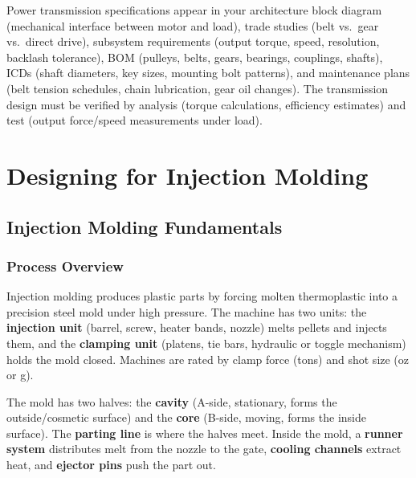 \documentclass[11pt,letterpaper,twoside,openany]{book}
\begin{document}
\begin{tipbox}
Power transmission specifications appear in your architecture block diagram (mechanical interface between motor and load), trade studies (belt vs.\ gear vs.\ direct drive), subsystem requirements (output torque, speed, resolution, backlash tolerance), BOM (pulleys, belts, gears, bearings, couplings, shafts), ICDs (shaft diameters, key sizes, mounting bolt patterns), and maintenance plans (belt tension schedules, chain lubrication, gear oil changes). The transmission design must be verified by analysis (torque calculations, efficiency estimates) and test (output force/speed measurements under load).
\end{tipbox}


\FloatBarrier
\chapter{Designing for Injection Molding}

\vspace{1em}




\vspace{1em}


\FloatBarrier
\section{Injection Molding Fundamentals}

\subsection{Process Overview}

Injection molding produces plastic parts by forcing molten thermoplastic into a precision steel mold under high pressure. The machine has two units: the \textbf{injection unit} (barrel, screw, heater bands, nozzle) melts pellets and injects them, and the \textbf{clamping unit} (platens, tie bars, hydraulic or toggle mechanism) holds the mold closed. Machines are rated by clamp force (tons) and shot size (oz or g).

The mold has two halves: the \textbf{cavity} (A-side, stationary, forms the outside/cosmetic surface) and the \textbf{core} (B-side, moving, forms the inside surface). The \textbf{parting line} is where the halves meet. Inside the mold, a \textbf{runner system} distributes melt from the nozzle to the gate, \textbf{cooling channels} extract heat, and \textbf{ejector pins} push the part out.
\end{document}
